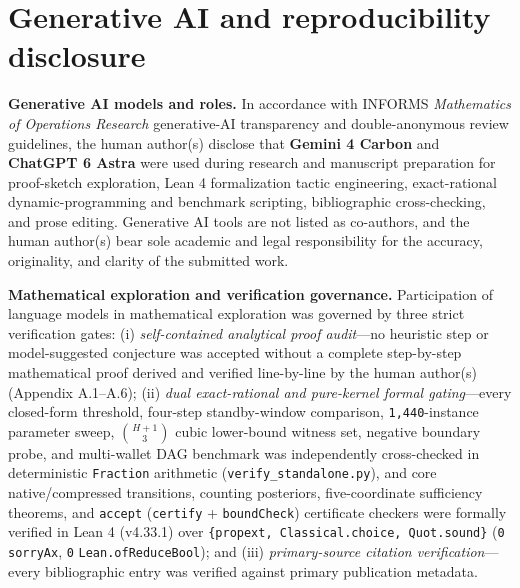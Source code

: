 \documentclass[11pt,letterpaper]{article}
\begin{document}
\section*{Generative AI and reproducibility
disclosure}\label{generative-ai-and-reproducibility-disclosure}

\textbf{Generative AI models and roles.} In accordance with INFORMS
\emph{Mathematics of Operations Research} generative-AI transparency and
double-anonymous review guidelines, the human author(s) disclose that
\textbf{Gemini 4 Carbon} and \textbf{ChatGPT 6 Astra} were used during
research and manuscript preparation for proof-sketch exploration, Lean 4
formalization tactic engineering, exact-rational dynamic-programming and
benchmark scripting, bibliographic cross-checking, and prose editing.
Generative AI tools are not listed as co-authors, and the human
author(s) bear sole academic and legal responsibility for the accuracy,
originality, and clarity of the submitted work.

\textbf{Mathematical exploration and verification governance.}
Participation of language models in mathematical exploration was
governed by three strict verification gates: (i) \emph{self-contained
analytical proof audit}---no heuristic step or model-suggested
conjecture was accepted without a complete step-by-step mathematical
proof derived and verified line-by-line by the human author(s) (Appendix
A.1--A.6); (ii) \emph{dual exact-rational and pure-kernel formal
gating}---every closed-form threshold, four-step standby-window
comparison, \texttt{1,440}-instance parameter sweep, \(\binom{H+1}{3}\)
cubic lower-bound witness set, negative boundary probe, and multi-wallet
DAG benchmark was independently cross-checked in deterministic
\texttt{Fraction} arithmetic (\texttt{verify\_standalone.py}), and core
native/compressed transitions, counting posteriors, five-coordinate
sufficiency theorems, and \texttt{accept} (\texttt{certify} +
\texttt{boundCheck}) certificate checkers were formally verified in Lean
4 (v4.33.1) over \texttt{\{propext,\ Classical.choice,\ Quot.sound\}}
(\texttt{0} \texttt{sorryAx}, \texttt{0} \texttt{Lean.ofReduceBool});
and (iii) \emph{primary-source citation verification}---every
bibliographic entry was verified against primary publication metadata.
\end{document}
